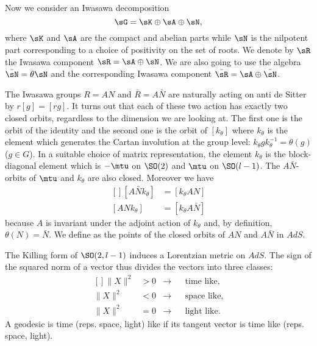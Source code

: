 Now we consider an Iwasawa decomposition
\begin{equation}
	\sG=\sK\oplus\sA\oplus\sN,
\end{equation}
where $\sK$ and $\sA$ are the compact and abelian parts while $\sN$ is the nilpotent part corresponding to a choice of positivity on the set of roots. We denote by $\sR$ the Iwasawa component $\sR=\sA\oplus\sN$. We are also going to use the algebra $\bar\sN=\theta\sN$ and the corresponding Iwasawa component $\bar\sR=\sA\oplus\bar\sN$.

The Iwasawa groups $R=AN$ and $\bar R=A\bar N$ are naturally acting on anti de Sitter by $r[g]=[rg]$. It turns out that each of these two action has exactly two closed orbits, regardless to the dimension we are looking at. The first one is the orbit of the identity and the second one is the orbit of $[k_{\theta}]$ where $k_{\theta}$ is the element which generates the Cartan involution at the group level: $k_{\theta}gk_{\theta}^{-1}=\theta(g)$ ($g\in G$). In a suitable choice of matrix representation, the element $k_{\theta}$ is the block-diagonal element which is $-\mtu$ on $\SO(2)$ and $\mtu$ on $\SO(l-1)$. The $A\bar N$-orbits of $\mtu$ and $k_{\theta}$ are also closed. Moreover we have
\begin{equation}
	\begin{aligned}[]
		[A\bar N k_{\theta}]&=[k_{\theta}AN]\\
		[AN k_{\theta}]&=[k_{\theta}A\bar N]
	\end{aligned}
\end{equation}
because $A$ is invariant under the adjoint action of $k_{\theta}$ and, by definition, $\theta(N)=\bar N$. We define as  the points of the closed orbits of $AN$ and $A\bar N$ in $AdS$.

The Killing form of $\SO(2,l-1)$ induces a Lorentzian metric on $AdS$. The sign of the squared norm of a vector thus divides the vectors into three classes:
\begin{equation}
	\begin{aligned}[]
		\| X \|^2&>0&\rightarrow&&\text{time like,}\\
		\| X \|^2&<0&\rightarrow&&\text{space like,}\\
		\| X \|^2&=0&\rightarrow&&\text{light like.}
	\end{aligned}
\end{equation}
A geodesic is time (reps. space, light) like if its tangent vector is time like (reps. space, light).

